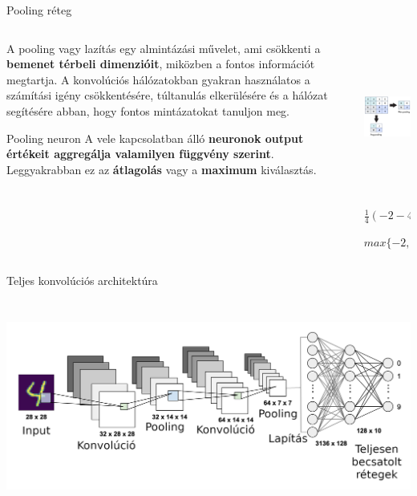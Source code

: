 \documentclass[english, aspectratio=169]{beamer}
\begin{document}
\begin{frame}{Pooling réteg}
\begin{columns}
\begin{column}{.5\textwidth}
A pooling vagy lazítás egy almintázási művelet, ami csökkenti a \textbf{bemenet térbeli dimenzióit}, miközben a fontos információt megtartja. A konvolúciós hálózatokban gyakran használatos a számítási igény csökkentésére, túltanulás elkerülésére és a hálózat segítésére abban, hogy fontos mintázatokat tanuljon meg.\par\smallskip
\begin{block}{Pooling neuron}
A vele kapcsolatban álló \textbf{neuronok output értékeit aggregálja valamilyen függvény szerint}. Leggyakrabban ez az \textbf{átlagolás} vagy a \textbf{maximum} kiválasztás.
\end{block}
\end{column}
\begin{column}{.5\textwidth}
\begin{center}
\includegraphics[height=5cm, width=7cm, keepaspectratio]{images/dl_6.png}
\end{center}
$\frac{1}{4}(-2 -4 +14 -11)=-1$\par\smallskip
$max\{-2, -4, 14, -11\}=14$
\end{column}
\end{columns}
\end{frame}

\begin{frame}{Teljes konvolúciós architektúra}
\begin{center}
\includegraphics[height=7cm, width=14cm, keepaspectratio]{images/dl_7.png}
\end{center}
\end{frame}
\end{document}
